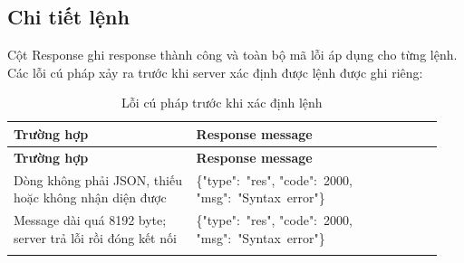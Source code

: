 \documentclass[12pt,a4paper]{article}
\newcommand{\cmd}[1]{\texttt{\seqsplit{#1}}}
\newcommand{\js}[1]{{\ttfamily #1}}
\begin{document}
\subsection{Chi tiết lệnh}

Cột Response ghi response thành công và toàn bộ mã lỗi áp dụng cho từng lệnh. Các lỗi cú pháp xảy ra trước khi server xác định được lệnh được ghi riêng:

\begin{longtable}{@{}P{0.40\linewidth} R{0.54\linewidth}@{}}
\toprule
\textbf{Trường hợp} & \textbf{Response message} \\
\midrule\endfirsthead
\toprule
\textbf{Trường hợp} & \textbf{Response message} \\
\midrule\endhead
Dòng không phải JSON, thiếu hoặc không nhận diện được \cmd{cmd} & \js{\{"type":~"res", "code":~2000, "msg":~"Syntax~error"\}} \\
Message dài quá 8192 byte; server trả lỗi rồi đóng kết nối & \js{\{"type":~"res", "code":~2000, "msg":~"Syntax~error"\}} \\
\bottomrule
\caption{Lỗi cú pháp trước khi xác định lệnh}\label{tab:protocol-errors}
\end{longtable}
\end{document}

